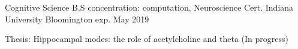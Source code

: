 
\begin{cventries}

  \cventry
    {Cognitive Science B.S concentration: computation, Neuroscience Cert.} %
    {Indiana University Bloomington} %
    {} %
    {exp. May 2019} %
    {
      \begin{cvitems} %
	\item{Thesis: Hippocampal modes: the role of acetylcholine and theta (In progress)}
      \end{cvitems}
    }


\end{cventries}
